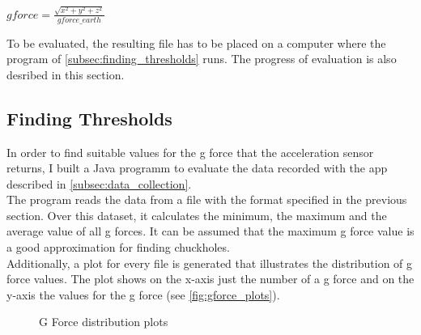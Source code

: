 \documentclass[10pt,a4paper]{article} %
\begin{document}
		\begin{center}
			$ gforce = \frac{\sqrt{x^2 + y^2 + z^2}}{gforce\_earth} $
		\end{center}

		\noindent
		To be evaluated, the resulting file has to be placed on a computer where the program of \autoref{subsec:finding_thresholds} runs.
		The progress of evaluation is also desribed in this section.
		
	\subsection{Finding Thresholds}\label{subsec:finding_thresholds}

		In order to find suitable values for the g force that the acceleration sensor returns, I built a Java programm to evaluate the data recorded with the app described in \autoref{subsec:data_collection}.\\
		The program reads the data from a file with the format specified in the previous section.
		Over this dataset, it calculates the minimum, the maximum and the average value of all g forces.
		It can be assumed that the maximum g force value is a good approximation for finding chuckholes.\\
		Additionally, a plot for every file is generated that illustrates the distribution of g force values.
		The plot shows on the x-axis just the number of a g force and on the y-axis the values for the g force (see \autoref{fig:gforce_plots}).

		\begin{figure}[H]
	  \centering
	  \hfill
	  \caption{G Force distribution plots}
	  \label{fig:gforce_plots}
	\end{figure}
\end{document}
